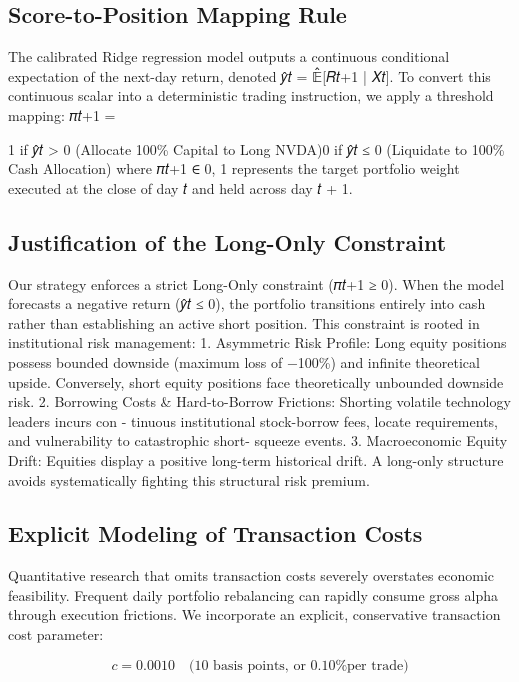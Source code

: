 \documentclass[12pt, a4paper]{article}
\begin{document}
\subsection{Score-to-Position Mapping Rule}
The calibrated Ridge regression model outputs a continuous conditional expectation of the next-day 
return, denoted 𝑦̂𝑡 = 𝔼̂[𝑅{𝑡+1} | 𝑋𝑡].
To convert this continuous scalar into a deterministic trading instruction, we apply a threshold mapping:
𝜋𝑡+1 = {1 if 𝑦̂𝑡 > 0 (Allocate 100\% Capital to Long NVDA)0 if 𝑦̂𝑡 ≤ 0 (Liquidate to 100\% Cash Allocation)
where 𝜋𝑡+1 ∈ {0, 1} represents the target portfolio weight executed at the close of day 𝑡 and held across 
day 𝑡 + 1.

\subsection{Justification of the Long-Only Constraint}
Our strategy enforces a strict Long-Only constraint (𝜋𝑡+1 ≥ 0). When the model forecasts a negative 
return (𝑦̂𝑡 ≤ 0), the portfolio transitions entirely into cash rather than establishing an active short position. 
This constraint is rooted in institutional risk management:
1. Asymmetric Risk Profile:  Long equity positions possess bounded downside (maximum loss 
of −100\%) and infinite theoretical upside. Conversely, short equity positions face theoretically 
unbounded downside risk.
2. Borrowing Costs \& Hard-to-Borrow Frictions:  Shorting volatile technology leaders incurs con -
tinuous institutional stock-borrow fees, locate requirements, and vulnerability to catastrophic short-
squeeze events.
3. Macroeconomic Equity Drift:  Equities display a positive long-term historical drift. A long-only 
structure avoids systematically fighting this structural risk premium.

\subsection{Explicit Modeling of Transaction Costs}

Quantitative research that omits transaction costs severely overstates economic feasibility. Frequent daily portfolio rebalancing can rapidly consume gross alpha through execution frictions. We incorporate an explicit, conservative transaction cost parameter:

\begin{equation}
c = 0.0010 \quad \text{(10 basis points, or 0.10\% per trade)}
\end{equation}

}
\end{document}
